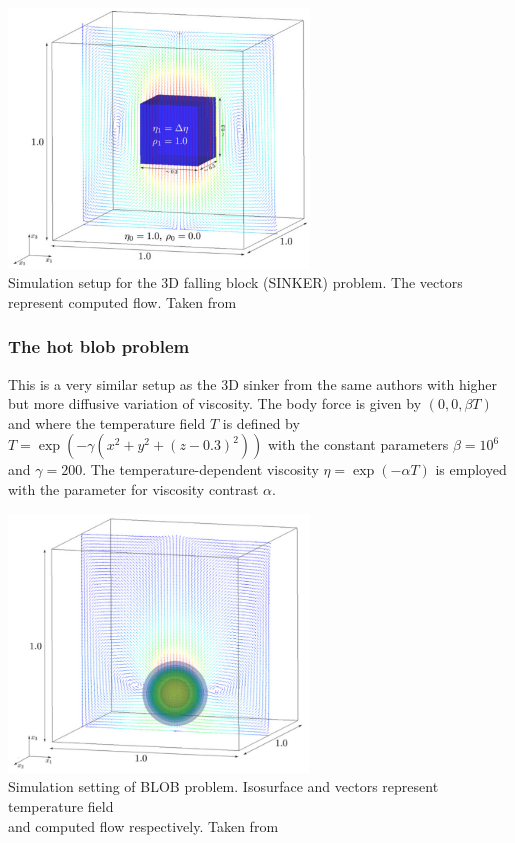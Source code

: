 \begin{center}
\includegraphics[width=8cm]{images/benchmark_sinker/fumt11}\\
{\captionfont Simulation setup for the 3D falling block (SINKER) problem. The vectors represent computed flow.
Taken from \cite{fumt11}}
\end{center}



\subsubsection{The hot blob problem}\label{sec:hotblob}

This is a very similar setup as the 3D sinker from the same authors
with higher but more diffusive variation of viscosity.
The body force is given by $(0, 0, \beta T)$ and
where the temperature field $T$ is defined by $T = \exp  (-\gamma (x^2+y^2+(z-0.3)^2))$ 
with the constant parameters $\beta=10^6$ and $\gamma=200$. 
The temperature-dependent viscosity $\eta = \exp( -\alpha T)$ is employed with the parameter for viscosity
contrast $\alpha$.

\begin{center}
\includegraphics[width=8cm]{images/benchmark_hotblob/fumt11}\\
{\captionfont Simulation setting of BLOB problem. Isosurface and vectors represent temperature field \\and computed flow respectively. Taken from \cite{fumt11}}
\end{center}

